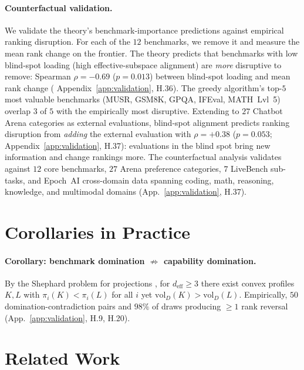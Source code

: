 \documentclass{article}
\begin{document}
\paragraph{Counterfactual validation.}
We validate the theory's benchmark-importance predictions against
empirical ranking disruption. For each of the $12$ benchmarks, we
remove it and measure the mean rank change on the frontier. The
theory predicts that benchmarks with low blind-spot loading (high
effective-subspace alignment) are \emph{more} disruptive to remove:
Spearman $\rho = -0.69$ ($p = 0.013$) between blind-spot loading
and mean rank change (
Appendix~\ref{app:validation}, H.36). The greedy algorithm's top-$5$
most valuable benchmarks (MUSR, GSM8K, GPQA, IFEval, MATH~Lvl~5)
overlap $3$ of $5$ with the empirically most disruptive. Extending
to $27$ Chatbot Arena categories as external evaluations, blind-spot
alignment predicts ranking disruption from \emph{adding} the external
evaluation with $\rho = +0.38$ ($p = 0.053$;
Appendix~\ref{app:validation}, H.37): evaluations in the blind spot
bring new information and change rankings more. The counterfactual analysis validates against $12$ core benchmarks,
$27$ Arena preference categories, $7$ LiveBench sub-tasks, and
Epoch~AI cross-domain data spanning coding, math, reasoning,
knowledge, and multimodal domains
(App.~\ref{app:validation}, H.37).


\section{Corollaries in Practice}
\label{sec:cor}

\paragraph{Corollary: benchmark domination $\not\Rightarrow$ capability domination.}
By the Shephard problem for projections
\citep{petty1967projection, schneider1967projections}, for
$d_{\mathrm{eff}} \ge 3$ there exist convex profiles $K, L$ with
$\pi_i(K) < \pi_i(L)$ for all $i$ yet $\mathrm{vol}_D(K) >
\mathrm{vol}_D(L)$. Empirically, $50$ domination-contradiction pairs
and $98\%$ of draws producing $\ge 1$ rank reversal
(App.~\ref{app:validation}, H.9, H.20).

\section{Related Work}
\label{sec:related}
\end{document}
